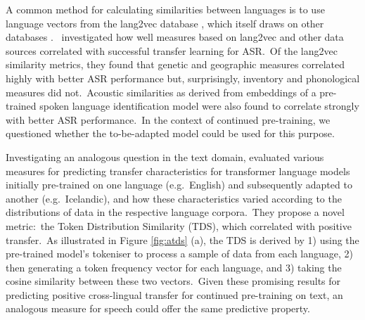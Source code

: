 \documentclass[main.tex]{subfiles}
\begin{document}

A common method for calculating similarities between languages is to use language vectors from the lang2vec database \parencite{littell2017uriel}, which itself draws on other databases \parencite[e.g.~phonological information from WALS:][]{haspelmath2009typological}.~\textcite{9688276} investigated how well measures based on lang2vec and other data sources correlated with successful transfer learning for ASR.~Of the lang2vec similarity metrics, they found that genetic and geographic measures correlated highly with better ASR performance but, surprisingly, inventory and phonological measures did not.~Acoustic similarities as derived from embeddings of a pre-trained spoken language identification model were also found to correlate strongly with better ASR performance.~In the context of continued pre-training, we questioned whether the to-be-adapted model could be used for this purpose.

Investigating an analogous question in the text domain, \textcite{gogoulou2023study} evaluated various measures for predicting transfer characteristics for transformer language models initially pre-trained on one language (e.g.~English) and subsequently adapted to another (e.g.~Icelandic), and how these characteristics varied according to the distributions of data in the respective language corpora.~They propose a novel metric:~the Token Distribution Similarity (TDS), which correlated with positive transfer.~As illustrated in Figure \ref{fig:atds} (a), the TDS is derived by 1) using the pre-trained model's tokeniser to process a sample of data from each language, 2) then generating a token frequency vector for each language, and 3) taking the cosine similarity between these two vectors.~Given these promising results for predicting positive cross-lingual transfer for continued pre-training on text, an analogous measure for speech could offer the same predictive property.
\end{document}
